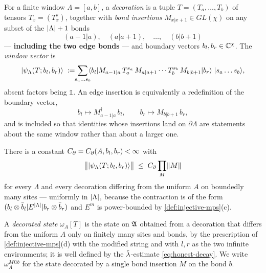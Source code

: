 \begin{definition}
\label{def:window-vector}
For a finite window $\Lambda = [a,b]$, a \emph{decoration} is a tuple
$T = (T_{a},\dots,T_{b})$ of tensors $T_{x} = (T_{x}^{s})$, together with
\emph{bond insertions} $M_{x|x+1} \in GL(\chi)$ on any subset of the
$\lvert \Lambda\rvert+1$ bonds
\begin{equation}
  (a-1|a), \quad (a|a+1), \quad \dots, \quad (b|b+1)
\end{equation}
--- \textbf{including the two edge bonds} --- and boundary vectors
$b_{l}, b_{r} \in \mathbb{C}^{\chi}$. The \emph{window vector} is
\begin{equation}
  |\psi_{\Lambda}(T; b_{l}, b_{r})\rangle \; := \!\!
  \sum_{s_{a} \ldots s_{b}} \!\!
  \langle b_{l}| M_{a-1|a} \, T_{a}^{s_{a}} \, M_{a|a+1} \cdots
  T_{b}^{s_{b}} \, M_{b|b+1} |b_{r}\rangle \; |s_{a} \ldots s_{b}\rangle,
  \label{eq:window-vector}
\end{equation}
absent factors being $\mathbb{1}$. An edge insertion is equivalently a
redefinition of the boundary vector,
\begin{equation}
  b_{l} \mapsto M_{a-1|a}^{\dagger} \, b_{l},
  \qquad
  b_{r} \mapsto M_{b|b+1} \, b_{r} ,
\end{equation}
and is included so that identities whose insertions land on $\partial \Lambda$
are statements about the same window rather than about a larger one.

There is a constant $C_{\partial} = C_{\partial}(A, b_{l}, b_{r}) < \infty$ with
\begin{equation}
  \bigl\Vert |\psi_{\Lambda}(T; b_{l}, b_{r})\rangle \bigr\Vert
  \;\le\; C_{\partial} \prod_{M} \lVert M\rVert
  \label{eq:cbd}
\end{equation}
for every $\Lambda$ and every decoration differing from the uniform $A$ on
boundedly many sites --- uniformly in $\lvert \Lambda\rvert$, because the contraction
is of the form $(b_{l} \otimes \bar{b}_{l} \vert E^{\lvert \Lambda\rvert} \vert
b_{r} \otimes \bar{b}_{r})$ and $E^{m}$ is power-bounded by
\cref{def:injective-mps}(c).

A \emph{decorated state} $\omega_{A}[T]$ is the state on $\mathfrak{A}$ obtained from a
decoration that differs from the uniform $A$ only on finitely many sites and
bonds, by the prescription of \cref{def:injective-mps}(d) with the modified
string and with $l, r$ as the two infinite environments; it is well defined by
the $\tilde{\lambda}$-estimate \eqref{eq:honest-decay}. We write $\omega_{A}^{M@b}$ for
the state decorated by a single bond insertion $M$ on the bond $b$.
\end{definition}


